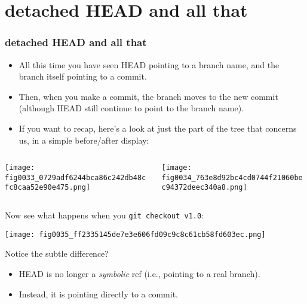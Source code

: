 \documentclass[presentation]{beamer}
\begin{document}
\section{detached HEAD and all that}
\label{sec-10}
\begin{frame}
\frametitle{detached HEAD and all that}
\label{sec-10-1}


\footnotesize

\begin{itemize}
\item All this time you have seen HEAD pointing to a branch name, and the branch
  itself pointing to a commit.
\item Then, when you make a commit, the branch moves
  to the new commit (although HEAD still continue to point to the branch name).
\item If you want to recap, here's a look at just the part of the tree that concerns
  us, in a simple before/after display:
\end{itemize}
\begin{columns}
\begin{column}{0.5\textwidth}
\label{sec-10-1-1}



\texttt{[image: fig0033\_0729adf6244bca86c242db48cfc8caa52e90e475.png]}
\end{column}
\begin{column}{0.5\textwidth}
\label{sec-10-1-2}


\texttt{[image: fig0034\_763e8d92bc4cd0744f21060bec94372deec340a8.png]}
\end{column}
\end{columns}
\end{frame}
\begin{frame}

Now see what happens when you \texttt{git checkout v1.0}:

\texttt{[image: fig0035\_ff2335145de7e3e606fd09c9c8c61cb58fd603ec.png]}



Notice the subtle difference?  

\begin{itemize}
\item HEAD is no longer a \emph{symbolic} ref (i.e., pointing to a real
  branch).
\item Instead, it is pointing directly to a commit.
\end{itemize}
\end{frame}
\end{document}

